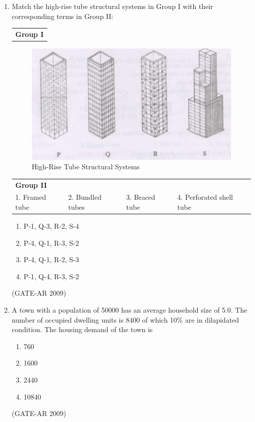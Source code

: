 \documentclass[a4paper,10pt]{article}
\begin{document}
\begin{enumerate}
    \item Match the high-rise tube structural systems in Group I with their corresponding terms in Group II:  \\
    \begin{tabular}{ l }
	\textbf{Group I} \\
	\end{tabular}
	\begin{figure}[h!]
        \centering
        \includegraphics[width=0.5\linewidth]{figs/img_02.jpg}
	\caption{High-Rise Tube Structural Systems}
    \label{fig:Img02}
	\end{figure}
    \begin{tabular}{ l l l l }
	\textbf{Group II} & & & \\
	1. Framed tube & 2. Bundled tubes & 3. Braced tube & 4. Perforated shell tube \\
	\end{tabular}
	\begin{multicols}{2}
	\begin{enumerate}
        \item P-1, Q-3, R-2, S-4
        \item P-4, Q-1, R-3, S-2
        \item P-4, Q-1, R-2, S-3
        \item P-1, Q-4, R-3, S-2
    \end{enumerate}
	\end{multicols}
    \hfill (GATE-AR 2009)

    \item A town with a population of 50000 has an average household size of 5.0. The number of occupied dwelling units is 8400 of which 10\% are in dilapidated condition. The housing demand of the town is 
    \begin{multicols}{4}
	\begin{enumerate}
        \item 760
        \item 1600
        \item 2440
        \item 10840
    \end{enumerate}
	\end{multicols}
    \hfill (GATE-AR 2009)


\end{enumerate}
\end{document}
